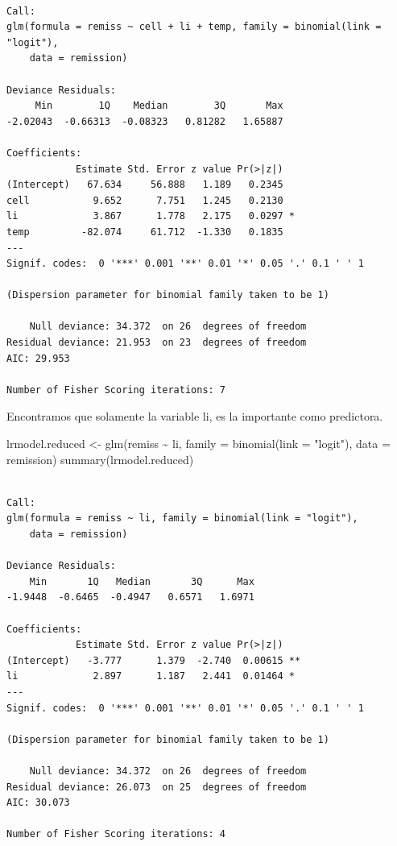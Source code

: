 \documentclass[
  letterpaper,
  DIV=11,
  numbers=noendperiod]{scrartcl}
\newenvironment{Shaded}{\begin{snugshade}}{\end{snugshade}}
\newcommand{\AttributeTok}[1]{\textcolor[rgb]{0.40,0.45,0.13}{#1}}
\newcommand{\FunctionTok}[1]{\textcolor[rgb]{0.28,0.35,0.67}{#1}}
\newcommand{\NormalTok}[1]{\textcolor[rgb]{0.00,0.23,0.31}{#1}}
\newcommand{\OtherTok}[1]{\textcolor[rgb]{0.00,0.23,0.31}{#1}}
\newcommand{\SpecialCharTok}[1]{\textcolor[rgb]{0.37,0.37,0.37}{#1}}
\newcommand{\StringTok}[1]{\textcolor[rgb]{0.13,0.47,0.30}{#1}}
\begin{document}
\begin{verbatim}

Call:
glm(formula = remiss ~ cell + li + temp, family = binomial(link = "logit"), 
    data = remission)

Deviance Residuals: 
     Min        1Q    Median        3Q       Max  
-2.02043  -0.66313  -0.08323   0.81282   1.65887  

Coefficients:
            Estimate Std. Error z value Pr(>|z|)  
(Intercept)   67.634     56.888   1.189   0.2345  
cell           9.652      7.751   1.245   0.2130  
li             3.867      1.778   2.175   0.0297 *
temp         -82.074     61.712  -1.330   0.1835  
---
Signif. codes:  0 '***' 0.001 '**' 0.01 '*' 0.05 '.' 0.1 ' ' 1

(Dispersion parameter for binomial family taken to be 1)

    Null deviance: 34.372  on 26  degrees of freedom
Residual deviance: 21.953  on 23  degrees of freedom
AIC: 29.953

Number of Fisher Scoring iterations: 7
\end{verbatim}

Encontramos que solamente la variable li, es la importante como
predictora.

\begin{Shaded}
\begin{Highlighting}[]
\NormalTok{lrmodel.reduced }\OtherTok{\textless{}{-}} \FunctionTok{glm}\NormalTok{(remiss }\SpecialCharTok{\textasciitilde{}}\NormalTok{ li, }\AttributeTok{family =} \FunctionTok{binomial}\NormalTok{(}\AttributeTok{link =} \StringTok{"logit"}\NormalTok{), }\AttributeTok{data =}\NormalTok{ remission)}
\FunctionTok{summary}\NormalTok{(lrmodel.reduced)}
\end{Highlighting}
\end{Shaded}

\begin{verbatim}

Call:
glm(formula = remiss ~ li, family = binomial(link = "logit"), 
    data = remission)

Deviance Residuals: 
    Min       1Q   Median       3Q      Max  
-1.9448  -0.6465  -0.4947   0.6571   1.6971  

Coefficients:
            Estimate Std. Error z value Pr(>|z|)   
(Intercept)   -3.777      1.379  -2.740  0.00615 **
li             2.897      1.187   2.441  0.01464 * 
---
Signif. codes:  0 '***' 0.001 '**' 0.01 '*' 0.05 '.' 0.1 ' ' 1

(Dispersion parameter for binomial family taken to be 1)

    Null deviance: 34.372  on 26  degrees of freedom
Residual deviance: 26.073  on 25  degrees of freedom
AIC: 30.073

Number of Fisher Scoring iterations: 4
\end{verbatim}
\end{document}
